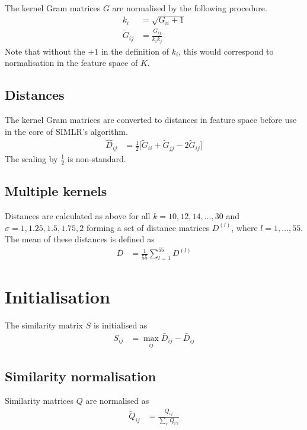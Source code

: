 \documentclass{article}
\begin{document}
The kernel Gram matrices $G$ are normalised by the following procedure.
\begin{align}
  k_i &= \sqrt{G_{ii} + 1} \\
  \tilde{G}_{ij} &= \frac{G_{ij}}{k_i k_j}
\end{align}
Note that without the $+1$ in the definition of $k_i$, this would correspond to
normalisation in the feature space of $K$.


\subsection{Distances}

The kernel Gram matrices are converted to distances in feature space before use
in the core of SIMLR's algorithm.
\begin{align}
  \hat{D}_{ij} &= \frac{1}{2} \big[ \tilde{G}_{ii} + \tilde{G}_{jj} - 2 \tilde{G}_{ij} \big]
\end{align}
The scaling by $\frac{1}{2}$ is non-standard.


\subsection{Multiple kernels}

Distances are calculated as above for all $k = 10, 12, 14, \dots, 30$ and
$\sigma = 1, 1.25, 1.5, 1.75, 2$ forming a set of distance matrices $D^{(l)}$,
where $l = 1, \dots, 55$. The mean of these distances is defined as
\begin{align}
  \bar{D} &= \frac{1}{55} \sum_{l=1}^{55} D^{(l)}
\end{align}



\section{Initialisation}

The similarity matrix $S$ is initialised as
\begin{align}
  S_{ij} &= \max_{ij}{\bar{D}_{ij}} - \bar{D}_{ij}
\end{align}


\subsection{Similarity normalisation}

Similarity matrices $Q$ are normalised as
\begin{align}
  \tilde{Q}_{ij} &= \frac{Q_{ij}}{\sum_{i'} Q_{i'i}}
\end{align}
\end{document}
